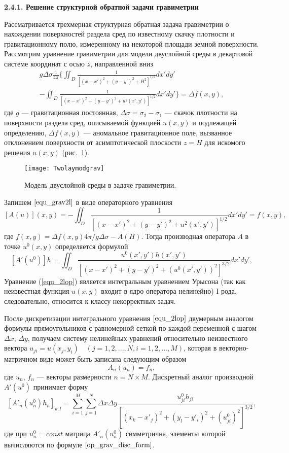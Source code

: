 {\bfseries 2.4.1. Решение структурной обратной задачи гравиметрии} 

Рассматривается трехмерная структурная обратная задача гравиметрии о нахождении поверхностей раздела сред по известному скачку плотности и гравитационному полю, измеренному на некоторой площади земной поверхности.
Рассмотрим уравнение гравиметрии для модели двуслойной среды в декартовой системе координат с осью $z$, направленной вниз 
\begin{equation}\label{equ_grav2l}
\begin{aligned}
g\Delta\sigma\frac{1}{4\pi} \bigg\{ \iint_{D} \frac{1}{[(x-x')^2+(y-y')^2+H^2]^{1/2}}dx'dy' \\
- 
\iint_{D} \frac{1}{[(x-x')^2+(y-y')^2+u^2(x',y')]^{1/2}}dx'dy'\bigg\}=\Delta f(x,y),
\end{aligned} 
\end{equation}
где $g$ --- гравитационная постоянная, $\Delta\sigma=\sigma_2-\sigma_1$ --- скачок плотности на поверхности раздела сред, описываемой функцией $u(x,y)$ и подлежащей определению, $\Delta f(x,y)$ --- аномальное гравитационное поле, вызванное отклонением поверхности от асимптотической плоскости $z=H$ для искомого решения $u(x,y)$ (рис.~\ref{fig:twolayergrav}). 
\begin{figure}[H]
	\centering
	\texttt{[image: Twolaymodgrav]}
	\caption{Модель двуслойной среды в задаче гравиметрии.}
	\label{fig:twolayergrav}
	\end{figure}
Запишем $\eqref{equ_grav2l}$ в виде операторного уравнения
\begin{equation}\label{equ_2lop}
	[A(u)](x,y)=-\iint_{D} \frac{1}{[(x-x')^2+(y-y')^2+u^2(x',y')]^{1/2}}dx'dy'=f(x,y),
\end{equation}
где $f(x,y)=\Delta f(x,y) 4\pi/g\Delta\sigma - A(H)$. Тогда производная оператора $A$ в точке $u^0(x,y)$ определяется формулой
$$ [A'(u^0)]h=\iint_{D} \frac{u^0(x',y')h(x',y')}{[(x-x')^2+(y-y')^2+(u^0(x',y'))^2]^{3/2}}dx'dy', $$
Уравнение (\ref{equ_2lop}) является интегральным уравнением Урысона (так как неизвестная функция $u(x,y)$ входит в ядро оператора нелинейно) I рода, следовательно, относится к классу некорректных задач.
	
После дискретизации интегрального уравнения $\eqref{equ_2lop}$ двумерным аналогом формулы прямоугольников с равномерной сеткой по каждой переменной с шагом $\Delta x$, $\Delta y$, получаем систему нелинейных уравнений относительно неизвестного вектора $u_{ji}=u(x_j,y_i)\quad (j=1,2,...,N, i=1,2,...,M)$, которая в векторно-матричном виде может быть записана следующим образом
\begin{equation}\label{equ_snle}
	A_n(u_n)=f_n,
\end{equation}
где $u_n$, $f_n$ --- векторы размерности $n=N\times M$. Дискретный аналог производной $A'(u^0)$ принимает форму
\begin{equation}\label{op_grav_disc_form}
	[A'_n(u_n^0)h_n]_{k,l}=\sum\limits_{i=1}^{M}\sum\limits_{j=1}^{N}
	\Delta x\Delta y\frac{u^0_{ji}h_{ji}}{[(x_k-x'_j)^2+(y_l-y'_i)^2+(u^0_{ji})^2]^{3/2}},
\end{equation}
где при $u_{n}^{0}=const$ матрица $A'_n(u_n^0)$ симметрична, элементы которой вычисляются по формуле $\eqref{op_grav_disc_form}$.

